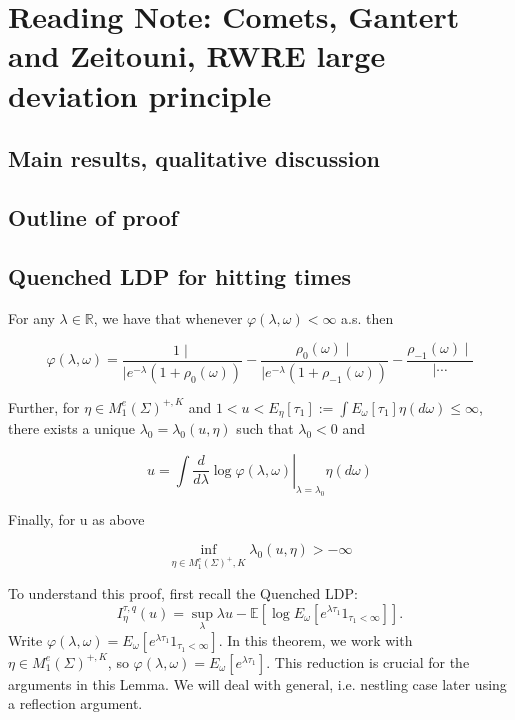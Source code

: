 \section{Reading Note: Comets, Gantert and Zeitouni, RWRE large deviation principle}

\subsection{Main results, qualitative discussion}


\subsection{Outline of proof}

\subsection{Quenched LDP for hitting times}


\begin{lem}[Lemma 1]
	\label{lem:Comet00Lemma1}
	For any $\lambda \in \mathbb{R}$, we have that whenever $\varphi(\lambda, \omega)<\infty$ a.s. then

\[
\varphi(\lambda, \omega)=\frac{1 \mid}{\mid e^{-\lambda}\left(1+\rho_0(\omega)\right)}-\frac{\rho_0(\omega) \mid}{\mid e^{-\lambda}\left(1+\rho_{-1}(\omega)\right)}-\frac{\rho_{-1}(\omega) \mid}{\mid \cdots}
\]


Further, for $\eta \in M_1^e(\Sigma)^{+, K}$ and $1<u<E_\eta\left[\tau_1\right]:=\int E_\omega\left[\tau_1\right] \eta(d \omega) \leq \infty$, there exists a unique $\lambda_0=\lambda_0(u, \eta)$ such that $\lambda_0<0$ and

\[
u=\left.\int \frac{d}{d \lambda} \log \varphi(\lambda, \omega)\right|_{\lambda=\lambda_0} \eta(d \omega)
\]


Finally, for u as above

\[
\inf _{\eta \in M_1^e(\Sigma)^{+}, K} \lambda_0(u, \eta)>-\infty
\]
\end{lem}

To understand this proof, first recall the Quenched LDP:
\[
	I_ \eta ^{\tau, q} (u) = \sup _\lambda \lambda u - \mathbb{E}\left[ \log E_\omega \left[ e^{\lambda \tau_1} 1_{\tau_1< \infty } \right]  \right] 
.\] 
Write $\varphi(\lambda, \omega) = E_\omega\left[ e^{\lambda \tau_1} 1_{\tau_1 < \infty } \right] $. In this theorem, we work with $\eta \in M_1^e(\Sigma)^{+, K}$, so $\varphi(\lambda, \omega) = E_\omega\left[ e^{\lambda \tau_1}\right] $. This reduction is crucial for the arguments in this Lemma. We will deal with general, i.e. nestling case later using a reflection argument.

